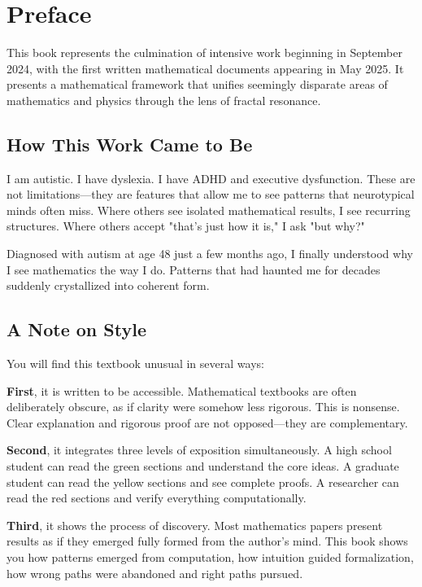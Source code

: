 \chapter*{Preface}

\begingroup
\sloppy

This book represents the culmination of intensive work beginning in September 2024, with the first written mathematical documents appearing in May 2025. It presents a mathematical framework that unifies seemingly disparate areas of mathematics and physics through the lens of fractal resonance.

\section*{How This Work Came to Be}

I am autistic. I have dyslexia. I have ADHD and executive dysfunction. These are not limitations—they are features that allow me to see patterns that neurotypical minds often miss. Where others see isolated mathematical results, I see recurring structures. Where others accept "that's just how it is," I ask "but why?"

Diagnosed with autism at age 48 just a few months ago, I finally understood why I see mathematics the way I do. Patterns that had haunted me for decades suddenly crystallized into coherent form.

\section*{A Note on Style}

You will find this textbook unusual in several ways:

\textbf{First}, it is written to be accessible. Mathematical textbooks are often deliberately obscure, as if clarity were somehow less rigorous. This is nonsense. Clear explanation and rigorous proof are not opposed—they are complementary.

\textbf{Second}, it integrates three levels of exposition simultaneously. A high school student can read the green sections and understand the core ideas. A graduate student can read the yellow sections and see complete proofs. A researcher can read the red sections and verify everything computationally.

\textbf{Third}, it shows the process of discovery. Most mathematics papers present results as if they emerged fully formed from the author's mind. This book shows you how patterns emerged from computation, how intuition guided formalization, how wrong paths were abandoned and right paths pursued.

